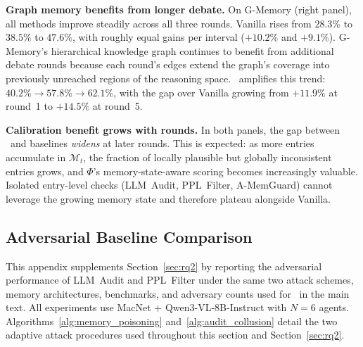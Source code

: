 \textbf{Graph memory benefits from longer debate.}
On G-Memory (right panel), all methods improve
steadily across all three rounds.  Vanilla rises
from $28.3\%$ to $38.5\%$ to $47.6\%$, with roughly
equal gains per interval ($+10.2\%$ and $+9.1\%$).
G-Memory's hierarchical knowledge graph continues
to benefit from additional debate rounds because
each round's edges extend the graph's coverage into
previously unreached regions of the reasoning space.
\system\ amplifies this trend:
$40.2\% \to 57.8\% \to 62.1\%$, with the gap over
Vanilla growing from $+11.9\%$ at round~1 to $+14.5\%$
at round~5.

\textbf{Calibration benefit grows with rounds.}
In both panels, the gap between \system\ and
baselines \emph{widens} at later rounds.  This is
expected: as more entries accumulate in
$\mathcal{M}_t$, the fraction of locally plausible
but globally inconsistent entries grows, and
$\Phi$'s memory-state-aware scoring becomes
increasingly valuable.  Isolated entry-level
checks (LLM~Audit, PPL~Filter, A-MemGuard) cannot
leverage the growing memory state and therefore
plateau alongside Vanilla.

\subsection{Adversarial Baseline Comparison}
\label{app:adversarial_baselines}

This appendix supplements Section~\ref{sec:rq2} by
reporting the adversarial performance of LLM~Audit
and PPL~Filter under the same two attack schemes,
memory architectures, benchmarks, and adversary
counts used for \system\ in the main text.  All
experiments use MacNet + Qwen3-VL-8B-Instruct with $N=6$
agents. Algorithms~\ref{alg:memory_poisoning}
and~\ref{alg:audit_collusion} detail the two
adaptive attack procedures used throughout this
section and Section~\ref{sec:rq2}.

